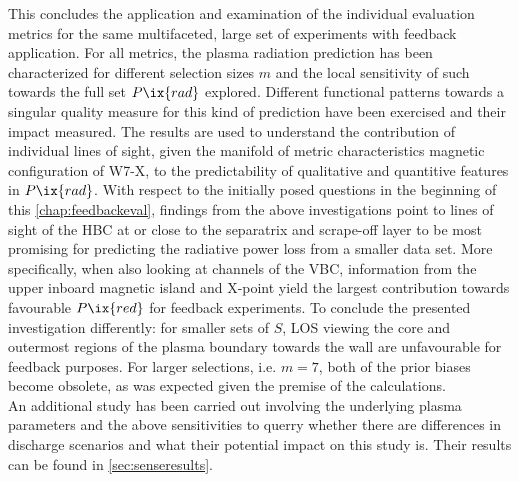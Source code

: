                 This concludes the application and examination of the individual evaluation metrics for the same multifaceted, large set of experiments with feedback application. For all metrics, the plasma radiation prediction has been characterized for different selection sizes $m$ and the local sensitivity of such towards the full set $P\ix{rad}$ explored. Different functional patterns towards a singular quality measure for this kind of prediction have been exercised and their impact measured. The results are used to understand the contribution of individual lines of sight, given the manifold of metric characteristics magnetic configuration of W7-X, to the predictability of qualitative and quantitive features in $P\ix{rad}$. With respect to the initially posed questions in the beginning of this \cref{chap:feedbackeval}, findings from the above investigations point to lines of sight of the HBC at or close to the separatrix and scrape-off layer to be most promising for predicting the radiative power loss from a smaller data set. More specifically, when also looking at channels of the VBC, information from the upper inboard magnetic island and X-point yield the largest contribution towards favourable $P\ix{red}$ for feedback experiments. To conclude the presented investigation differently: for smaller sets of $S$, LOS viewing the core and outermost regions of the plasma boundary towards the wall are unfavourable for feedback purposes. For larger selections, i.e. $m=7$, both of the prior biases become obsolete, as was expected given the premise of the calculations.\\%
                An additional study has been carried out involving the underlying plasma parameters and the above sensitivities to querry whether there are differences in discharge scenarios and what their potential impact on this study is. Their results can be found in \cref{sec:senseresults}.%
%
%
